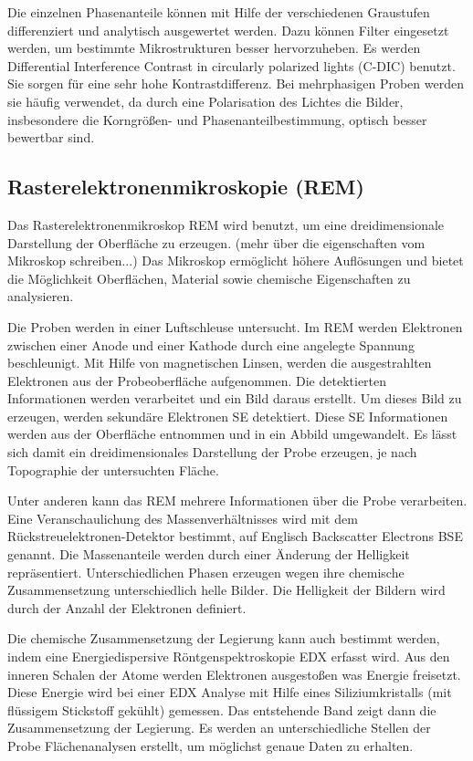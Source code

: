 Die einzelnen Phasenanteile können mit Hilfe der verschiedenen Graustufen differenziert und analytisch ausgewertet werden. Dazu können Filter eingesetzt werden, um bestimmte Mikrostrukturen besser hervorzuheben. Es werden Differential Interference Contrast in circularly polarized lights (C-DIC) benutzt. Sie sorgen für eine sehr hohe Kontrastdifferenz. Bei mehrphasigen Proben werden sie häufig verwendet, da durch eine Polarisation des Lichtes die Bilder, insbesondere die Korngrößen- und Phasenanteilbestimmung, optisch besser bewertbar sind.

\subsection{Rasterelektronenmikroskopie (REM)}

Das Rasterelektronenmikroskop REM wird benutzt, um eine dreidimensionale Darstellung der Oberfläche zu erzeugen. (mehr über die eigenschaften vom Mikroskop schreiben...) Das Mikroskop ermöglicht höhere Auflösungen und bietet die Möglichkeit Oberflächen, Material sowie chemische Eigenschaften zu analysieren. 

Die Proben werden in einer Luftschleuse untersucht. Im REM werden Elektronen zwischen einer Anode und einer Kathode durch eine angelegte Spannung beschleunigt. Mit Hilfe von magnetischen Linsen, werden die ausgestrahlten Elektronen aus der Probeoberfläche aufgenommen. Die detektierten Informationen werden verarbeitet und ein Bild daraus erstellt. Um dieses Bild zu erzeugen, werden sekundäre Elektronen SE detektiert. Diese SE Informationen werden aus der Oberfläche entnommen und in ein Abbild umgewandelt. Es lässt sich damit ein dreidimensionales Darstellung der Probe erzeugen, je nach Topographie der untersuchten Fläche.

Unter anderen kann das REM mehrere Informationen über die Probe verarbeiten. Eine Veranschaulichung des Massenverhältnisses wird mit dem Rückstreuelektronen-Detektor bestimmt, auf Englisch Backscatter Electrons BSE genannt. Die Massenanteile werden durch einer Änderung der Helligkeit repräsentiert. Unterschiedlichen Phasen erzeugen wegen ihre chemische Zusammensetzung unterschiedlich helle Bilder. Die Helligkeit der Bildern wird durch der Anzahl der Elektronen definiert.

Die chemische Zusammensetzung der Legierung kann auch bestimmt werden, indem eine Energiedispersive Röntgenspektroskopie EDX erfasst wird. Aus den inneren Schalen der Atome werden Elektronen ausgestoßen was Energie freisetzt. Diese Energie wird bei einer EDX Analyse mit Hilfe eines Siliziumkristalls (mit flüssigem Stickstoff gekühlt) gemessen. Das entstehende Band zeigt dann die Zusammensetzung der Legierung. Es werden an unterschiedliche Stellen der Probe Flächenanalysen erstellt, um möglichst genaue Daten zu erhalten.


